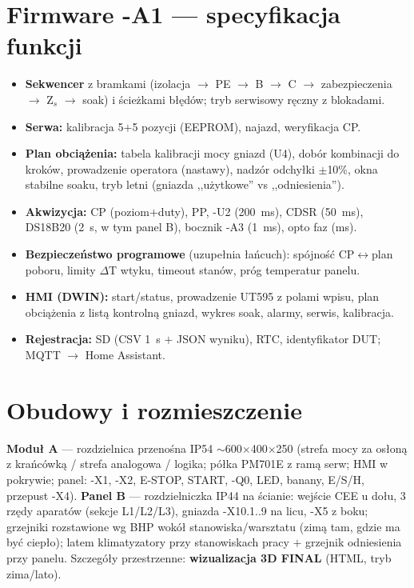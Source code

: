 \documentclass[11pt,a4paper]{article}
\begin{document}
\section{Firmware -A1 --- specyfikacja funkcji}
\begin{itemize}
\item \textbf{Sekwencer} z bramkami (izolacja $\to$ PE $\to$ B $\to$ C $\to$ zabezpieczenia $\to$
Z$_s$ $\to$ soak) i ścieżkami błędów; tryb serwisowy ręczny z blokadami.
\item \textbf{Serwa:} kalibracja 5$+$5 pozycji (EEPROM), najazd, weryfikacja CP.
\item \textbf{Plan obciążenia:} tabela kalibracji mocy gniazd (U4), dobór kombinacji do kroków,
prowadzenie operatora (nastawy), nadzór odchyłki $\pm$10\%, okna stabilne soaku, tryb letni
(gniazda ,,użytkowe'' vs ,,odniesienia'').
\item \textbf{Akwizycja:} CP (poziom$+$duty), PP, -U2 (200~ms), CDSR (50~ms), DS18B20 (2~s,
w tym panel B), bocznik -A3 (1~ms), opto faz (ms).
\item \textbf{Bezpieczeństwo programowe} (uzupełnia łańcuch): spójność CP$\leftrightarrow$plan
poboru, limity $\Delta$T wtyku, timeout stanów, próg temperatur panelu.
\item \textbf{HMI (DWIN):} start/status, prowadzenie UT595 z polami wpisu, plan obciążenia
z listą kontrolną gniazd, wykres soak, alarmy, serwis, kalibracja.
\item \textbf{Rejestracja:} SD (CSV 1~s $+$ JSON wyniku), RTC, identyfikator DUT; MQTT $\to$
Home Assistant.
\end{itemize}

\section{Obudowy i rozmieszczenie}
\textbf{Moduł A} --- rozdzielnica przenośna IP54 $\sim$600$\times$400$\times$250 (strefa mocy za
osłoną z krańcówką / strefa analogowa / logika; półka PM701E z ramą serw; HMI w pokrywie; panel:
-X1, -X2, E-STOP, START, -Q0, LED, banany, E/S/H, przepust -X4). \textbf{Panel B} --- rozdzielniczka
IP44 na ścianie: wejście CEE u dołu, 3 rzędy aparatów (sekcje L1/L2/L3), gniazda -X10.1..9 na
licu, -X5 z boku; grzejniki rozstawione wg BHP wokół stanowiska/warsztatu (zimą tam, gdzie ma być
ciepło); latem klimatyzatory przy stanowiskach pracy $+$ grzejnik odniesienia przy panelu.
Szczegóły przestrzenne: \textbf{wizualizacja 3D FINAL} (HTML, tryb zima/lato).
\end{document}

